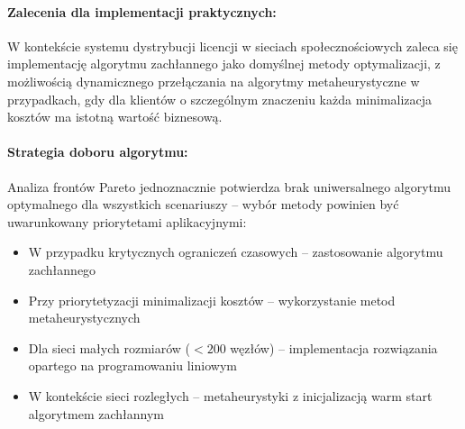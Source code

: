 \paragraph{Zalecenia dla implementacji praktycznych:}
W kontekście systemu dystrybucji licencji w sieciach społecznościowych zaleca się implementację algorytmu zachłannego jako domyślnej metody optymalizacji, z możliwością dynamicznego przełączania na algorytmy metaheurystyczne w przypadkach, gdy dla klientów o szczególnym znaczeniu każda minimalizacja kosztów ma istotną wartość biznesową.

\paragraph{Strategia doboru algorytmu:}
Analiza frontów Pareto jednoznacznie potwierdza brak uniwersalnego algorytmu optymalnego dla wszystkich scenariuszy -- wybór metody powinien być uwarunkowany priorytetami aplikacyjnymi:
\begin{itemize}
  \item W przypadku krytycznych ograniczeń czasowych -- zastosowanie algorytmu zachłannego
  \item Przy priorytetyzacji minimalizacji kosztów -- wykorzystanie metod metaheurystycznych
  \item Dla sieci małych rozmiarów ($<200$ węzłów) -- implementacja rozwiązania opartego na programowaniu liniowym
  \item W kontekście sieci rozległych -- metaheurystyki z inicjalizacją warm start algorytmem zachłannym
\end{itemize}
